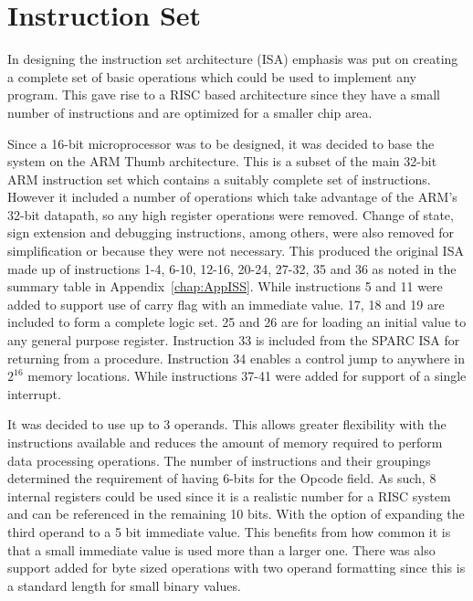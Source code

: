 
\chapter{Instruction Set}

In designing the instruction set architecture (ISA) emphasis was put on creating a complete set of basic operations which could be used to implement any program. This gave rise to a RISC based architecture since they have a small number of instructions and are optimized for a smaller chip area.

Since a 16-bit microprocessor was to be designed, it was decided to base the system on the ARM Thumb architecture. This is a subset of the main 32-bit ARM instruction set which contains a suitably complete set of instructions. However it included a number of operations which take advantage of the ARM's 32-bit datapath, so any high register operations were removed. Change of state, sign extension and debugging instructions, among others, were also removed for simplification or because they were not necessary. This produced the original ISA made up of instructions 1-4, 6-10, 12-16, 20-24, 27-32, 35 and 36 as noted in the summary table in Appendix~\ref{chap:AppISS}. While instructions 5 and 11 were added to support use of carry flag with an immediate value. 17, 18 and 19 are included to form a complete logic set. 25 and 26 are for loading an initial value to any general purpose register. Instruction 33 is included from the SPARC ISA for returning from a procedure. Instruction 34 enables a control jump to anywhere in $2^{16}$ memory locations. While instructions 37-41 were added for support of a single interrupt.

It was decided to use up to 3 operands. This allows greater flexibility with the instructions available and reduces the amount of memory required to perform data processing operations. The number of instructions and their groupings determined the requirement of having 6-bits for the Opcode field. As such, 8 internal registers could be used since it is a realistic number for a RISC system and can be referenced in the remaining 10 bits. With the option of expanding the third operand to a 5 bit immediate value. This benefits from how common it is that a small immediate value is used more than a larger one. There was also support added for byte sized operations with two operand formatting since this is a standard length for small binary values. 

